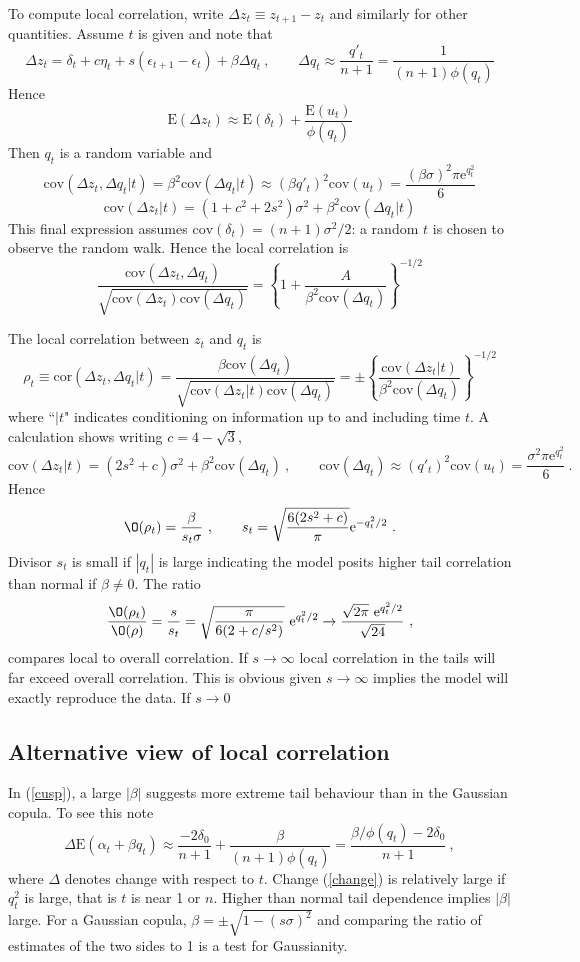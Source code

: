 \documentclass[authoryear]{elsarticle}
\newcommand{\E}{\mathrm{E}}
\newcommand{\e}{\mathrm{e}}
\newcommand{\cov}{\mathrm{cov}}
\newcommand{\eps}{\epsilon}
\newcommand{\cor}{\mathrm{cor}}
\newcommand{\eref}[1]{(\ref{#1})}
\newcommand{\cq}{\ , \qquad}
\newcommand{\be}[1]{\begin{equation}\label{#1}}
\newcommand{\ee}{\end{equation}}
\begin{document}
To compute local correlation, write $\Delta z_t\equiv z_{t+1}-z_t$ and similarly for other quantities.    Assume $t$ is given and note that 
$$
\Delta z_t =\delta_t +c\eta_t + s(\eps_{t+1}-\eps_t)+\beta\Delta q_t  \cq \Delta q_t\approx \frac{q'_t}{n+1} = \frac{1}{(n+1)\phi(q_t)}
$$
Hence
$$
\E(\Delta z_t) \approx \E(\delta_t) + \frac{\E(u_t)}{\phi(q_t)} 
$$
  Then $q_t$ is a random variable and 
$$
\cov(\Delta z_t,\Delta q_t|t) = \beta^2\cov(\Delta q_t|t)\approx (\beta q'_t)^2\cov(u_t)= \frac{(\beta\sigma)^2\pi\e^{q_t^2}}{6} 
$$$$
\cov(\Delta z_t|t) = (1+c^2 + 2s^2)\sigma^2 + \beta^2\cov(\Delta q_t|t) 
$$
This final expression assumes $\cov(\delta_t)=(n+1)\sigma^2/2$:  a random $t$ is chosen to observe the random walk. 
Hence the local correlation is 
$$
\frac{\cov(\Delta z_t,\Delta q_t)}{\sqrt{\cov(\Delta z_t)\cov(\Delta q_t)}} = \left\{1+\frac{A}{\beta^2\cov(\Delta q_t)}\right\}^{-1/2}
$$ 

The local correlation between $z_t$ and $q_t$ is 
$$
\rho_t\equiv\cor(\Delta z_t,\Delta q_t|t) =  \frac{\beta\cov(\Delta q_t)}{\sqrt{\cov(\Delta z_t|t)\cov(\Delta q_t)}}=\pm\left\{\frac{\cov(\Delta z_t|t)}{\beta^2\cov(\Delta q_t)}\right\}^{-1/2} 
$$
where ``$|t$" indicates conditioning on information up to and including time $t$.   A calculation shows writing $c=4-\sqrt 3$,
$$
\cov(\Delta z_t|t)  = (2s^2+c)\sigma^2+\beta^2\cov(\Delta q_t)\cq \cov(\Delta q_t) \approx (q'_t)^2\cov(u_t)= \frac{\sigma^2\pi\e^{q_t^2}}{6}
\ .
$$
Hence
$$
\O(\rho_t) = \frac{\beta}{s_t\sigma }
\cq 
s_t = \sqrt{\frac{6(2s^2+c)}{\pi}}\e^{-q_t^2/2}\ .
$$
Divisor $s_t$ is small if $|q_t|$ is large indicating the model posits higher tail correlation than normal if $\beta\ne 0$.  The ratio
$$
\frac{\O(\rho_t)}{\O(\rho)} =\frac{s}{s_t}= \sqrt{\frac{\pi}{6(2+c/s^2)}}\ \e^{q_t^2/2}\rightarrow \frac{\sqrt{2\pi}\ \e^{q_t^2/2}}{\sqrt{24}}\ ,
$$
compares local  to overall correlation.  If $s\rightarrow\infty$ local correlation in the tails  will far exceed overall  correlation.  This is obvious given $s\rightarrow\infty$ implies the model will exactly reproduce the data.  If $s\rightarrow0$

\subsection{Alternative view of local correlation}
In \eref{cusp},  a large $|\beta|$ suggests more extreme tail behaviour than in the Gaussian copula.  To see this note  
 \be{change}
\Delta \E( \alpha_t + \beta q_t)  \approx \frac{-2\delta_0}{n+1} + \frac{\beta}{(n+1)\phi(q_t)}= \frac{\beta/\phi(q_t)-2\delta_0}{n+1}\ ,
 \ee
 where $\Delta$ denotes change with respect to $t$.
Change \eref{change} is relatively large if $q_t^2$ is large, that is $t$ is near 1 or $n$. Higher than normal tail dependence implies $|\beta|$ large.  For a Gaussian copula, $\beta=\pm\sqrt{1-(s\sigma)^2}$ and comparing the ratio of estimates of the two sides to 1 is a test for Gaussianity.
\end{document}
